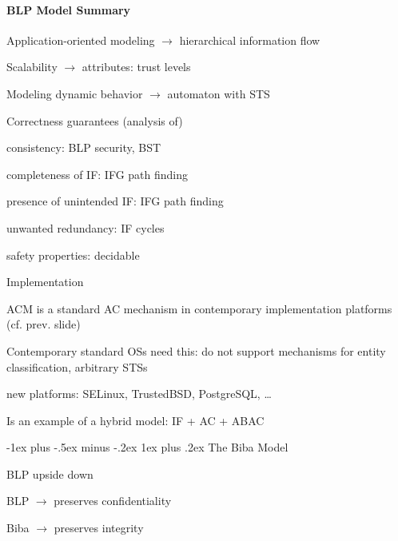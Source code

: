 \documentclass[a4paper]{article}
\makeatletter
\renewcommand{\subsubsection}{\@startsection{subsubsection}{3}{0mm}%
                {-1ex plus -.5ex minus -.2ex}%
                {1ex plus .2ex}%
                {\normalfont\small\bfseries}}
\makeatother
\begin{document}
\begin{multicols}{3}
    \paragraph{BLP Model Summary}
    \begin{itemize*}
        \item Application-oriented modeling $\rightarrow$ hierarchical information flow
        \item Scalability $\rightarrow$ attributes: trust levels
        \item Modeling dynamic behavior $\rightarrow$ automaton with STS
        \item Correctness guarantees (analysis of)
        \begin{itemize*}
            \item consistency: BLP security, BST
            \item completeness of IF: IFG path finding
            \item presence of unintended IF: IFG path finding
            \item unwanted redundancy: IF cycles
            \item safety properties: decidable
        \end{itemize*}
        \item Implementation
        \begin{itemize*}
            \item ACM is a standard AC mechanism in contemporary implementation platforms (cf. prev. slide)
            \item Contemporary standard OSs need this: do not support mechanisms for entity classification, arbitrary STSs
            \item new platforms: SELinux, TrustedBSD, PostgreSQL, \dots
        \end{itemize*}
        \item Is an example of a hybrid model: IF + AC + ABAC
    \end{itemize*}

    \subsubsection{The Biba Model}
    \begin{multicols}{2}
        BLP upside down
        \begin{itemize*}
            \item BLP $\rightarrow$ preserves confidentiality
            \item Biba $\rightarrow$ preserves integrity
        \end{itemize*}
        \columnbreak


\end{multicols}
\end{multicols}
\end{document}
